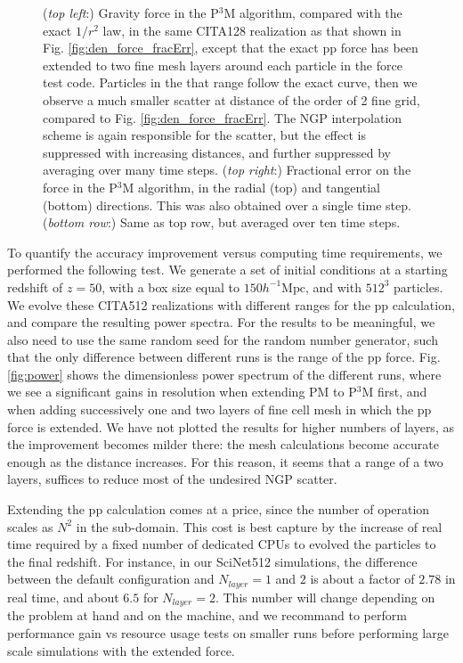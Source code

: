 \begin{figure}
\begin{center}
    \caption{({\it top left}:) Gravity force in the P$^3$M algorithm, compared with the exact $1/r^{2}$ law,
  in the same CITA128 realization as that shown in Fig. \ref{fig:den_force_fracErr}, 
  except that the exact pp force has been extended to two fine mesh layers around each particle
  in the force test code.
  Particles in the that range follow the exact curve, then we observe a much smaller scatter at 
  distance of the order of 2 fine grid, compared to Fig. \ref{fig:den_force_fracErr}. 
  The NGP interpolation scheme is again responsible for the scatter, but the effect is suppressed with increasing distances, and further suppressed by averaging over many time steps.
  ({\it top right}:) Fractional error on the force in the P$^3$M algorithm, in the radial (top) and tangential (bottom) directions.
  This was also obtained over a single time step.
  ({\it bottom row}:) Same as top row, but averaged over ten time steps.
    \label{fig:den_force_fracErr_ppext6}}
\end{center}
\end{figure}

 
 
 To quantify the accuracy improvement versus computing time requirements, we performed the following test.
 We generate a set of initial conditions at a starting redshift of $z = 50$, with a box size equal to $ 150 h^{-1}\mbox{Mpc}$,
 and with $512^{3}$ particles. We evolve these CITA512 realizations with different ranges for the pp calculation, and compare 
 the resulting power spectra. For the results to be meaningful, we also need to use the same random seed for the random number generator,
 such that the only difference between different runs is the range of the pp force.
 Fig. \ref{fig:power} shows the dimensionless power spectrum of the different runs, where we see a significant gains in resolution
 when extending  PM to P$^{3}$M first, and when adding successively one and two layers of fine cell mesh in which the pp force is extended.
We have not plotted the results for higher numbers of layers, as the improvement becomes milder there: the mesh calculations
become accurate enough as the distance increases. For this reason, it seems that a range of a two layers, suffices 
to reduce most of the undesired NGP scatter.

Extending the pp calculation comes at a price, since the number of operation scales as  $N^{2}$ in the sub-domain. 
This cost is best capture by the increase of real time required by a fixed number of dedicated  {\small CPU}s 
to evolved the particles to the final redshift. For instance, in our SciNet512 simulations, 
the difference between the default configuration and $N_{layer} = 1$ and $2$ is about a factor of $2.78$ in real time,
and about $6.5$ for $N_{layer} = 2$.
This number will change depending on the problem at hand and on the machine, and we recommand
to perform performance gain vs resource usage tests on smaller runs before performing large scale simulations
with the extended force.


